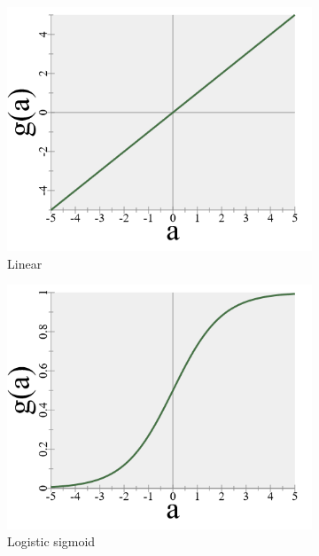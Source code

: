 \begin{figure}
    \centering
    \begin{subfigure}[b]{0.3\textwidth}
        \includegraphics[width=\textwidth]{images/4_linear.png}
        \caption{Linear}
        \label{fig:activation_linear}
    \end{subfigure}
    \begin{subfigure}[b]{0.3\textwidth}
        \includegraphics[width=\textwidth]{images/4_sigmoid.png}
        \caption{Logistic sigmoid}
        \label{fig:activation_sigmoid}
    \end{subfigure}
    \begin{subfigure}[b]{0.3\textwidth}

\end{subfigure}
\end{figure}
